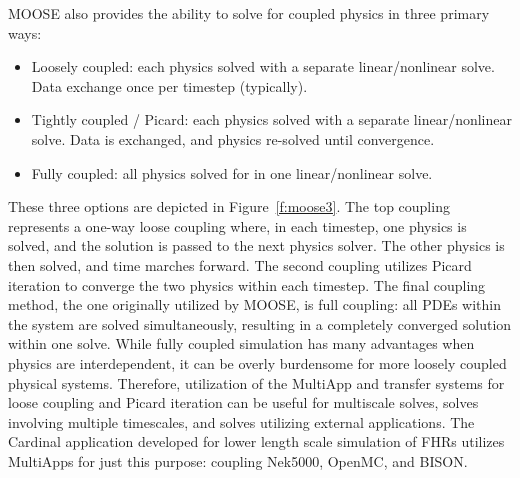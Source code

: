 MOOSE also provides the ability to solve for coupled physics in three primary ways:
\begin{itemize}
\item Loosely coupled: each physics solved with a separate linear/nonlinear solve. Data exchange once per
timestep (typically).
\item Tightly coupled / Picard: each physics solved with a separate linear/nonlinear solve. Data is exchanged, and physics re-solved until convergence.
\item Fully coupled: all physics solved for in one linear/nonlinear solve.
\end{itemize}
These three options are depicted in Figure~\ref{f:moose3}. The top coupling represents a one-way loose coupling where, in each timestep, one physics is solved, and the solution is passed to the next physics solver. The other physics is then solved, and time marches forward. The second coupling utilizes Picard iteration to converge the two physics within each timestep. The final coupling method, the one originally utilized by MOOSE, is full coupling: all PDEs within the system are solved simultaneously, resulting in a completely converged solution within one solve. While fully coupled simulation has many advantages when physics are interdependent, it can be
overly burdensome for more loosely coupled physical systems. Therefore, utilization of the MultiApp and transfer systems for loose coupling and Picard iteration can be useful for multiscale solves, solves involving multiple timescales, and solves utilizing external applications. The Cardinal application developed for lower length scale simulation of FHRs utilizes MultiApps for just this purpose: coupling Nek5000, OpenMC, and BISON.

